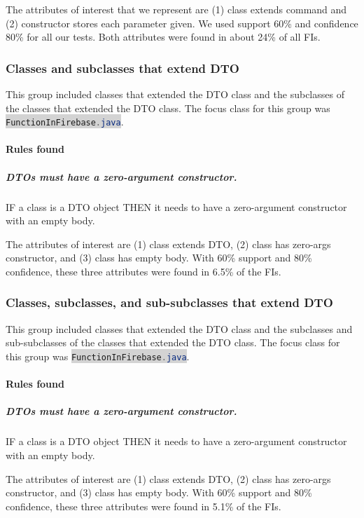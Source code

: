 \documentclass[12pt]{article}
\newcommand{\inlinecode}[2]{\colorbox{lightgray}{\lstinline[language=#1]$#2$}}
\begin{document}
			The attributes of interest that we represent are (1) class extends command and (2) constructor stores each parameter given. We used support 60\% and confidence 80\% for all our tests. Both attributes were found in about 24\% of all FIs.
			
				
	\subsubsection{Classes and subclasses that extend DTO }
		This group included classes that extended the DTO class and the subclasses of the classes that extended the DTO class. The focus class for this group was \inlinecode{Java}{FunctionInFirebase.java}.
		
		\paragraph {Rules found}
		
		\subparagraph{DTOs must have a zero-argument constructor.} IF a class is a DTO object THEN it needs to have a zero-argument constructor with an empty body.
		
		The attributes of interest are (1) class extends DTO, (2) class has zero-args constructor, and (3) class has empty body. With 60\% support and 80\% confidence, these three attributes were found in 6.5\% of the FIs.

	
	\subsubsection{Classes, subclasses, and sub-subclasses that extend DTO}
		This group included classes that extended the DTO class and the subclasses and sub-subclasses of the classes that extended the DTO class. The focus class for this group was  \inlinecode{Java}{FunctionInFirebase.java}.
		

		\paragraph {Rules found}
		
		\subparagraph{DTOs must have a zero-argument constructor.} IF a class is a DTO object THEN it needs to have a zero-argument constructor with an empty body.
		
		The attributes of interest are (1) class extends DTO, (2) class has zero-args constructor, and (3) class has empty body. With 60\% support and 80\% confidence, these three attributes were found in 5.1\% of the FIs.
		
\end{document}
